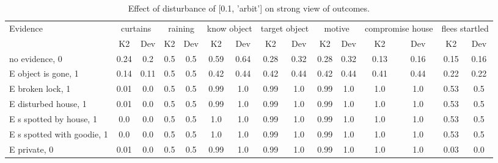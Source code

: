 \begin{table}\begin{tabular}{l|cc|cc|cc|cc|cc|cc|cc}\toprule\multirow{2}{*}{Evidence} & \multicolumn{2}{c}{curtains}& \multicolumn{2}{c}{raining}& \multicolumn{2}{c}{know object}& \multicolumn{2}{c}{target object}& \multicolumn{2}{c}{motive}& \multicolumn{2}{c}{compromise house}& \multicolumn{2}{c}{flees startled}\\& {K2} & {Dev}& {K2} & {Dev}& {K2} & {Dev}& {K2} & {Dev}& {K2} & {Dev}& {K2} & {Dev}& {K2} & {Dev}\\\midrule
no evidence, 0 & 0.24&0.2&0.5&0.5&\cellcolor{Bittersweet}0.59&\cellcolor{Bittersweet}0.64&0.28&0.32&0.28&0.32&0.13&0.16&0.15&0.16\\E object is gone, 1 & 0.14&0.11&0.5&0.5&0.42&0.44&0.42&0.44&0.42&0.44&0.41&0.44&0.22&0.22\\E broken lock, 1 & 0.01&0.0&0.5&0.5&0.99&1.0&0.99&1.0&0.99&1.0&1.0&1.0&0.53&0.5\\E disturbed house, 1 & 0.01&0.0&0.5&0.5&0.99&1.0&0.99&1.0&0.99&1.0&1.0&1.0&0.53&0.5\\E s spotted by house, 1 & 0.0&0.0&0.5&0.5&1.0&1.0&0.99&1.0&0.99&1.0&1.0&1.0&0.53&0.5\\E s spotted with goodie, 1 & 0.0&0.0&0.5&0.5&1.0&1.0&0.99&1.0&0.99&1.0&1.0&1.0&0.53&0.5\\E private, 0 & 0.01&0.0&0.5&0.5&0.99&1.0&0.99&1.0&0.99&1.0&1.0&1.0&0.03&0.0\\\bottomrule\end{tabular}\caption{Effect of disturbance of [0.1, 'arbit'] on strong view of outcomes.}\end{table}
